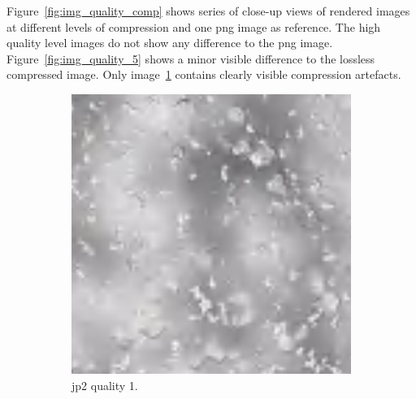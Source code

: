 Figure~\ref{fig:img_quality_comp} shows series of close-up views of rendered images at different levels of compression and one \gls{png} image as reference. The high quality level images do not show any difference to the \gls{png} image. Figure~\ref{fig:img_quality_5} shows a minor visible difference to the lossless compressed image. Only image~\ref{fig:img_quality_1} contains clearly visible compression artefacts.
\begin{figure}[htb]
    \centering
        \begin{subfigure}[b]{0.44\textwidth}
            \centering
            \includegraphics[width=\textwidth]{doc/thesis/0_figures/compare_quality/set1/center/jp2_1_center.png}
            \caption{\gls{jp2} quality 1.}
            \label{fig:img_quality_1}
        \end{subfigure}
        \begin{subfigure}[b]{0.44\textwidth}
            \centering

\end{subfigure}
\end{figure}
